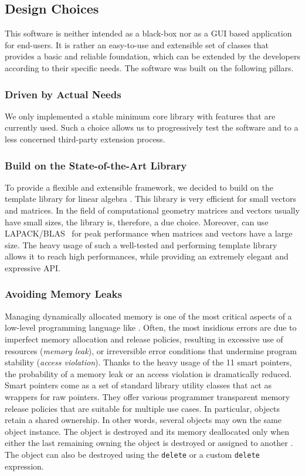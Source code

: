 \subsection{Design Choices}
This software is neither intended as a black-box nor as a GUI based application for end-users. It is rather an easy-to-use and extensible set of \cpp{} classes that provides a basic and reliable foundation, which can be extended by the developers according to their specific needs. The software was built on the following pillars.

\subsubsection{Driven by Actual Needs}
We only implemented a stable minimum core library with features that are currently used. Such a choice allows us to progressively test the software and to a less concerned third-party extension process.

\subsubsection{Build on the State-of-the-Art \Eigen{} Library}
To provide a flexible and extensible framework, we decided to build \Acme{} on the \Eigen{} template library for linear algebra \cite{eigen2010eigen}. This library is very efficient for small vectors and matrices. In the field of computational geometry matrices and vectors usually have small sizes, the \Eigen{} library is, therefore, a due choice. Moreover, \Eigen{} can use LAPACK/BLAS~\cite{anderson1999lapack} for peak performance when matrices and vectors have a large size. The heavy usage of such a well-tested and performing template library allows it to reach high performances, while providing an extremely elegant and expressive API.

\subsubsection{Avoiding Memory Leaks}
Managing dynamically allocated memory is one of the most critical aspects of a low-level programming language like \cpp{}. Often, the most insidious errors are due to imperfect memory allocation and release policies, resulting in excessive use of resources (\emph{memory leak}), or irreversible error conditions that undermine program stability (\emph{access violation}). Thanks to the heavy usage of the \cpp{}11 smart pointers, the probability of a memory leak or an access violation is dramatically reduced. Smart pointers come as a set of standard library utility classes that act as wrappers for raw pointers. They offer various programmer transparent memory release policies that are suitable for multiple use cases. In particular, \SharedPointer{} objects retain a shared ownership. In other words, several \SharedPointer{} objects may own the same object instance. The object is destroyed and its memory deallocated only when either the last remaining \SharedPointer{} owning the object is destroyed or assigned to another \SharedPointer{}. The object can also be destroyed using the \texttt{delete} or a custom \texttt{delete} expression.

